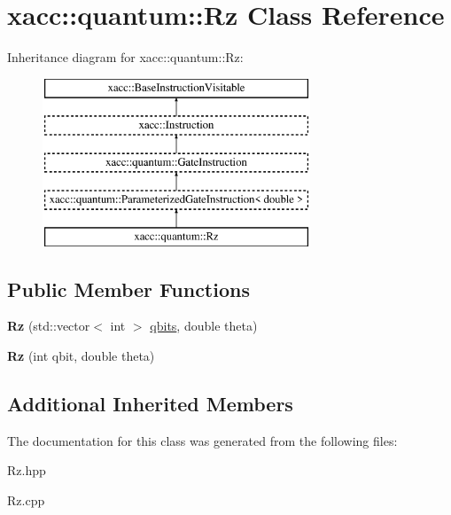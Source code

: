 \hypertarget{a01316}{}\section{xacc\+:\+:quantum\+:\+:Rz Class Reference}
\label{a01316}
Inheritance diagram for xacc\+:\+:quantum\+:\+:Rz\+:\begin{figure}[H]
\begin{center}
\leavevmode
\includegraphics[height=5.000000cm]{a01316}
\end{center}
\end{figure}
\subsection*{Public Member Functions}
\begin{DoxyCompactItemize}
\item 
\mbox{\label{a01316_a796911ad3db4bc4ba3cf1390d20471e4}} 
{\bfseries Rz} (std\+::vector$<$ int $>$ \hyperlink{a01276_a2a56be6c2519ea65df4d06f4abae1393}{qbits}, double theta)
\item 
\mbox{\label{a01316_ae30eaf75feb8f896c22043629d21b834}} 
{\bfseries Rz} (int qbit, double theta)
\end{DoxyCompactItemize}
\subsection*{Additional Inherited Members}


The documentation for this class was generated from the following files\+:\begin{DoxyCompactItemize}
\item 
Rz.\+hpp\item 
Rz.\+cpp\end{DoxyCompactItemize}
